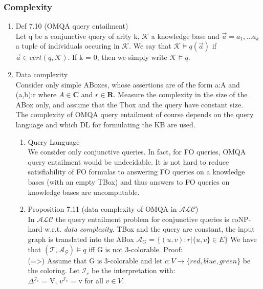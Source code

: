 \documentclass[11pt]{article}
\begin{document}
\subsubsection{Complexity}
\label{sec-1-2-2}
\begin{enumerate}
\item Def 7.10 (OMQA query entailment) \\
\label{sec-1-2-2-1}
Let q be a conjunctive query of arity k, $\mathcal{K}$ a knowledge
base and $\overset{\to}{a} = a_{1}, ... a_{k}$ a tuple of individuals
occuring in $\mathcal{K}$.
We say that $\mathcal{K} \models q(\overset{\to}{a})$ if 
$\overset{\to}{a} \in cert(q,\mathcal{K})$. If k = 0, then we 
simply write $\mathcal{K} \models q$.
\item Data complexity \\
\label{sec-1-2-2-2}
Consider only simple ABoxes, whose assertions are of the form
a:A and (a,b):r where $A\in \mathbf{C}$ and $r \in \mathbf{R}$.
Measure the complexity in the size of the ABox only, and
assume that the Tbox and the query have constant size.\\
     The complexity of OMQA query entailment of course depends on the 
query language and which DL for formulating the KB are used.
\begin{enumerate}
\item Query Language \\
\label{sec-1-2-2-2-1}
We consider only conjunctive queries.
In fact, for FO queries, OMQA query entailment would be 
undecidable. It is not hard to reduce satisfiability of FO formulas
to answering FO queries on a knowledge bases (with an empty TBox)
and thus answers to FO queries on knowledge bases are uncomputable.
\item Proposition 7.11 (data complexity of OMQA in $\mathcal{A}\mathcal{L}\mathcal{C}$) \\
\label{sec-1-2-2-2-2}
  In $\mathcal{A}\mathcal{L}\mathcal{C}$ the query entailment
  problem for conjunctive queries is coNP-hard w.r.t. \textit{data complexity}. 
  TBox and the query are constant, the input graph is translated 
  into the ABox $\mathcal{A}_{G}$ = $\{(u,v):r | \{u,v\}\in E\}$
  We have that $(\mathcal{T},\mathcal{A_{G}}) \models q$ 
  iff G is not 3-colorable.
  Proof:\\
     (=>) Assume that G is 3-colorable and let $c:V \to \{red,blue,green\}$
be the coloring. Let $\mathcal{I}_{c}$ be the interpretation with:\\
     $\Delta$$^{\mathcal{I}_{\text{c}}}$ = V, $v^{\mathcal{I}_{c}}$ = v for all $v \in V$. \\
$$
\end{enumerate}
\end{enumerate}
\end{document}

